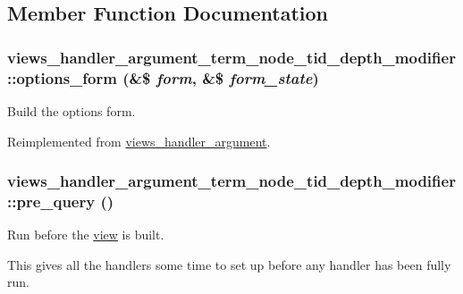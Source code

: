 \subsection{Member Function Documentation}
\hypertarget{classviews__handler__argument__term__node__tid__depth__modifier_aa4796e763923377f41dbf9bf415d96e8}{
\subsubsection[{options\_\-form}]{\setlength{\rightskip}{0pt plus 5cm}views\_\-handler\_\-argument\_\-term\_\-node\_\-tid\_\-depth\_\-modifier::options\_\-form (\&\$ {\em form}, \/  \&\$ {\em form\_\-state})}}
\label{classviews__handler__argument__term__node__tid__depth__modifier_aa4796e763923377f41dbf9bf415d96e8}
Build the options form. 

Reimplemented from \hyperlink{classviews__handler__argument_a44f015a0d527983ae6df2689f66b2c24}{views\_\-handler\_\-argument}.\hypertarget{classviews__handler__argument__term__node__tid__depth__modifier_a278abcb2e424241efa1361d01be89eb1}{
\subsubsection[{pre\_\-query}]{\setlength{\rightskip}{0pt plus 5cm}views\_\-handler\_\-argument\_\-term\_\-node\_\-tid\_\-depth\_\-modifier::pre\_\-query ()}}
\label{classviews__handler__argument__term__node__tid__depth__modifier_a278abcb2e424241efa1361d01be89eb1}
Run before the \hyperlink{classview}{view} is built.

This gives all the handlers some time to set up before any handler has been fully run. 

